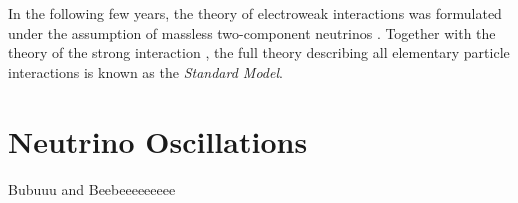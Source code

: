 \documentclass[english]{article}
\begin{document}
    In the following few years, the theory of electroweak interactions was formulated under the assumption of massless two-component neutrinos \cite{glashow1961} \cite{goldstonesalamweinberg1962} \cite{weinberg1967}. Together with the theory of the strong interaction \cite{grosswilczek1973} \cite{politzer1973}, the full theory describing all elementary particle interactions is known as the \textit{Standard Model}.

\section{Neutrino Oscillations}

	Bubuuu and Beebeeeeeeeee

\begin{thebibliography}{1}


\end{thebibliography}
\end{document}
